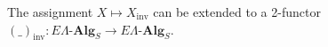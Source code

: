 \documentclass{amsbook} %
\newcommand{\mb}{\mathbf}
\numberwithin{section}{chapter}
\begin{document}
\begin{prop} \label{invprop} The assignment $X \mapsto X_{\mathrm{inv}}$ can be extended to a 2-functor $(\_)_{\mathrm{inv}}: E\Lambda\mbox{-}\mb{Alg}_S \to E\Lambda\mbox{-}\mb{Alg}_S$.
\end{prop}
\end{document}
